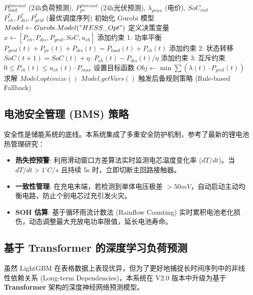 \begin{algorithm}[htbp]
    \caption{基于 Gurobi 的日前优化调度算法}
    \label{alg:dispatch}
    \begin{algorithmic}[1]
        \Require $P_{load}^{forecast}$ (24h负荷预测), $P_{pv}^{forecast}$ (24h光伏预测), $\lambda_{price}$ (电价), $SoC_{init}$
        \Ensure $P_{ch}^*, P_{dis}^*, P_{grid}^*$ (最优调度序列)
        \State 初始化 Gurobi 模型 $Model \gets Gurobi.Model("HESS\_Opt")$
        \State 定义决策变量 $x \gets [P_{ch}, P_{dis}, P_{grid}, SoC, u_{ch}]$
        \State 添加约束 1: 功率平衡 $P_{grid}(t) + P_{pv}(t) + P_{dis}(t) = P_{load}(t) + P_{ch}(t)$
        \State 添加约束 2: 状态转移 $SoC(t+1) = SoC(t) + \eta \cdot P_{ch}(t) - P_{dis}(t) / \eta$ \cite{wang2020battery}
        \State 添加约束 3: 互斥约束 $0 \le P_{ch}(t) \le u_{ch}(t) \cdot P_{max}$
        \EndFor
        \State 设置目标函数 $Obj \gets \min \sum (\lambda(t) \cdot P_{grid}(t))$
        \State 求解 $Model.optimize()$
        \State \Return $Model.getVars()$
        \Else
        \State 触发后备规则策略 (Rule-based Fallback)
        \EndIf
    \end{algorithmic}
\end{algorithm}

\subsection{电池安全管理 (BMS) 策略}
安全性是储能系统的底线。本系统集成了多重安全防护机制，参考了最新的锂电池热管理研究\cite{wang2020battery}：
\begin{itemize}
    \item \textbf{热失控预警}: 利用滑动窗口方差算法实时监测电芯温度变化率 ($dT/dt$)。当 $dT/dt > 1^{\circ}C/s$ 且持续 5s 时，立即切断主回路接触器。
    \item \textbf{一致性管理}: 在充电末端，若检测到单体电压极差 $> 50mV$，自动启动主动均衡电路，防止个别电芯过充引发火灾。
    \item \textbf{SOH 估算}: 基于循环雨流计数法 (Rainflow Counting) 实时累积电池老化损伤，动态调整最大充放电功率限值，延长电池寿命\cite{li2021optimal}。
\end{itemize}

\subsection{基于 Transformer 的深度学习负荷预测}

虽然 LightGBM 在表格数据上表现优异，但为了更好地捕捉长时间序列中的非线性依赖关系 (Long-term Dependencies)，本系统在 V2.0 版本中升级为基于 \textbf{Transformer} 架构的深度神经网络预测模型。

